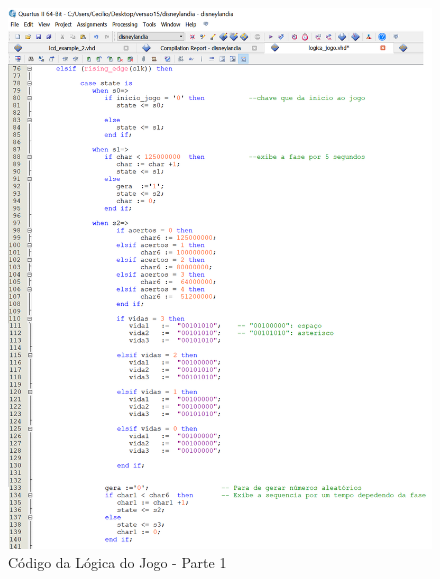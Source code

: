 \documentclass[14pt, oneside]{book}
\theoremstyle{definition}
\begin{document}
               \begin{figure}[H]
                    \centering
                    \includegraphics[scale=0.7]{logica_jogo_parte1.png}
                    \caption{Código da Lógica do Jogo - Parte 1}
                    \label{parte1}
                \end{figure}     
                  
\end{document}
